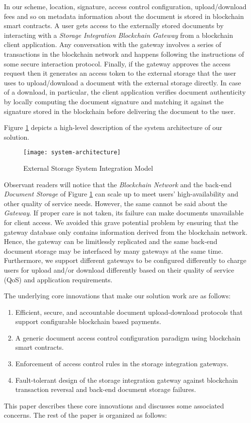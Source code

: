 In our scheme, location, signature, access control configuration, upload/download fees and so on metadata information about the document is stored in blockchain smart contracts. A user gets access to the externally stored documents by interacting with a \textit{Storage Integration Blockchain Gateway} from a blockchain client application. Any conversation with the gateway involves a series of transactions in the blockchain network and happens following the instructions of some secure interaction protocol. Finally, if the gateway approves the access request then it generates an access token to the external storage that the user uses to upload/download a document with the external storage directly. In case of a download, in particular, the client application verifies document authenticity by locally computing the document signature and matching it against the signature stored in the blockchain before delivering the document to the user. 

Figure \ref{fig-1} depicts a high-level description of the system architecture of our solution.   
\begin{figure}[h]
\label{fig-1}
\centering
\texttt{[image: system-architecture]}                    
\caption{External Storage System Integration Model}
\end{figure}
Observant readers will notice that the \textit{Blockchain Network} and the back-end \textit{Document Storage} of Figure \ref{fig-1} can scale up to meet users' high-availability and other quality of service needs. However, the same cannot be said about the \textit{Gateway}. If proper care is not taken, its failure can make documents unavailable for client access. We avoided this grave potential problem by ensuring that the gateway database only contains information derived from the blockchain network. Hence, the gateway can be limitlessly replicated and the same back-end document storage may be interfaced by many gateways at the same time. Furthermore, we support different gateways to be configured differently to charge users for upload and/or download differently based on their quality of service (QoS) and application requirements.

The underlying core innovations that make our solution work are as follows:
\begin{enumerate}
\item Efficient, secure, and accountable document upload-download protocols that support configurable blockchain based payments.
\item A generic document access control configuration paradigm using blockchain smart contracts. 
\item Enforcement of access control rules in the storage integration gateways.
\item Fault-tolerant design of the storage integration gateway against blockchain transaction reversal and back-end document storage failures.   
\end{enumerate}         
This paper describes these core innovations and discusses some associated concerns. The rest of the paper is organized as follows:

